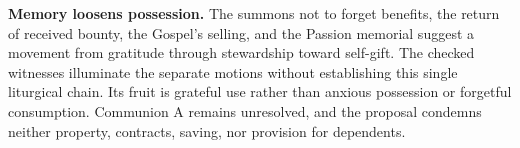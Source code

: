 \noindent\textbf{Memory loosens possession.\enspace{}}
The summons not to forget benefits, the return of received bounty, the Gospel's selling, and the Passion memorial suggest a movement from gratitude through stewardship toward self-gift. The checked witnesses illuminate the separate motions without establishing this single liturgical chain. Its fruit is grateful use rather than anxious possession or forgetful consumption. Communion A remains unresolved, and the proposal condemns neither property, contracts, saving, nor provision for dependents.
\endgroup
